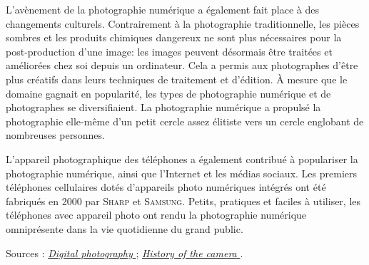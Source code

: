 L'avènement de la photographie numérique a également fait place à des changements culturels. Contrairement à la photographie traditionnelle, les pièces sombres et les produits chimiques dangereux ne sont plus nécessaires pour la post-production d'une image: les images peuvent désormais être traitées et améliorées chez soi depuis un ordinateur. Cela a permis aux photographes d’être plus créatifs dans leurs techniques de traitement et d’édition. À mesure que le domaine gagnait en popularité, les types de photographie numérique et de photographes se diversifiaient. La photographie numérique a propulsé la photographie elle-même d'un petit cercle assez élitiste vers un cercle englobant de nombreuses personnes.

L'appareil photographique des téléphones a également contribué à populariser la photographie numérique, ainsi que l'Internet et les médias sociaux. Les premiers téléphones cellulaires dotés d'appareils photo numériques intégrés ont été fabriqués en 2000 par \textsc{Sharp} et \textsc{Samsung}. Petits, pratiques et faciles à utiliser, les téléphones avec appareil photo ont rendu la photographie numérique omniprésente dans la vie quotidienne du grand public.

\noindent Sources : 
\href{https://en.wikipedia.org/wiki/Digital_photography\#History}{\textit{Digital photography} \faWikipediaW} ;
\href{https://en.wikipedia.org/wiki/History_of_the_camera\#Digital_cameras}{\textit{History of the camera} \faWikipediaW}.


